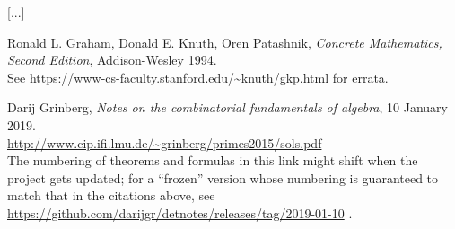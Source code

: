 \documentclass[paper=a4, fontsize=12pt]{scrartcl} %
\theoremstyle{plainsl}
\theoremstyle{definition}
\theoremstyle{remark}
\begin{document}
[...]

\begin{thebibliography}{99999999}                                                                                         %



Ronald L. Graham, Donald E. Knuth, Oren Patashnik,
\textit{Concrete Mathematics, Second Edition}, Addison-Wesley 1994.\\
See \url{https://www-cs-faculty.stanford.edu/~knuth/gkp.html} for errata.

Darij Grinberg,
\textit{Notes on the combinatorial fundamentals of algebra},
10 January 2019. \\
\url{http://www.cip.ifi.lmu.de/~grinberg/primes2015/sols.pdf}
\\
The numbering of theorems and formulas in this link might shift
when the project gets updated; for a ``frozen'' version whose
numbering is guaranteed to match that in the citations above, see
\url{https://github.com/darijgr/detnotes/releases/tag/2019-01-10} .

\end{thebibliography}
\end{document}
